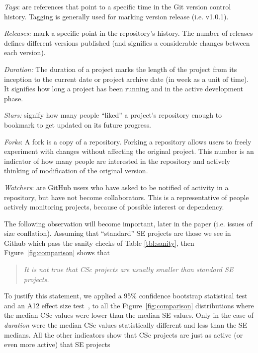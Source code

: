 \documentclass[conference,10pt]{IEEEtran}
\begin{document}
\textit{Tags}: are references that point to a specific time in the Git version control history. Tagging is generally used for marking version release (i.e. v1.0.1).


\textit{Releases:} mark a specific point in the repository’s history. The number of releases defines different versions published (and  signifies a considerable  changes  between each version).

\textit{Duration:} The duration of a project marks the length of the project from its inception to the current date or project archive date (in week as a unit of time). It signifies how long a project has been running and in the active development phase.





\textit{Stars:} signify how many people
  ``liked'' a project's repository enough to bookmark to get updated on its future progress.
  
   \textit{Forks}: A fork is a copy of a repository. Forking a repository allows users to freely experiment with changes without affecting the original project. This number
  is an indicator of how many people are interested in the repository and actively thinking
  of modification of the original version.
  
   \textit{Watchers}: are GitHub users who have asked to be notified of activity in a repository, but have not become collaborators. This is a representative of people actively monitoring projects, because of possible interest or dependency.
   
  
  The following observation  
  will become important, later in the paper (i.e. issues of size conflation).
Assuming that ``standard'' SE projects are those we see in Github which pass the sanity checks of Table \ref{tbl:sanity}, then
 Figure~\ref{fig:comparison} shows that
  \begin{quote}
  {\em It is not true that CSc projects are usually smaller than standard SE projects.}
  \end{quote}
 To justify this statement, we applied 
  a 95\% confidence bootstrap statistical test~\cite{efron94} and an A12 effect size test~\cite{arcuri2011practical}, to all the  Figure~\ref{fig:comparison} distributions where the median CSc values were lower than the median SE values.
Only in the case of {\em duration} were the median CSc values statistically different and less than the SE medians. All the other indicators show that CSc projects are just as active (or even more active) that SE projects 
\end{document}
